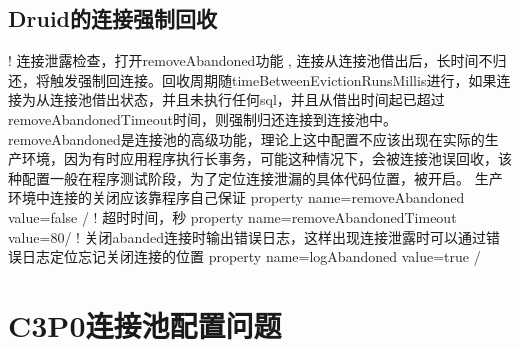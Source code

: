 \documentclass[a4,10pt,oneside,english]{sphinxmanual}
\begin{document}
\subsection{Druid的连接强制回收}
\label{\detokenize{interface/druid:id3}}
\begin{sphinxVerbatim}[commandchars=\\\{\}]
\PYGZlt{}!\PYGZhy{}\PYGZhy{} 连接泄露检查，打开removeAbandoned功能 , 连接从连接池借出后，长时间不归还，将触发强制回连接。回收周期随timeBetweenEvictionRunsMillis进行，如果连接为从连接池借出状态，并且未执行任何sql，并且从借出时间起已超过removeAbandonedTimeout时间，则强制归还连接到连接池中。
removeAbandoned是连接池的高级功能，理论上这中配置不应该出现在实际的生产环境，因为有时应用程序执行长事务，可能这种情况下，会被连接池误回收，该种配置一般在程序测试阶段，为了定位连接泄漏的具体代码位置，被开启。
生产环境中连接的关闭应该靠程序自己保证 \PYGZhy{}\PYGZhy{}\PYGZgt{}
\PYGZlt{}property name=\PYGZdq{}removeAbandoned\PYGZdq{} value=\PYGZdq{}false\PYGZdq{} /\PYGZgt{}
\PYGZlt{}!\PYGZhy{}\PYGZhy{} 超时时间，秒 \PYGZhy{}\PYGZhy{}\PYGZgt{}
\PYGZlt{}property name=\PYGZdq{}removeAbandonedTimeout\PYGZdq{} value=\PYGZdq{}80\PYGZdq{}/\PYGZgt{}
\PYGZlt{}!\PYGZhy{}\PYGZhy{} 关闭abanded连接时输出错误日志，这样出现连接泄露时可以通过错误日志定位忘记关闭连接的位置 \PYGZhy{}\PYGZhy{}\PYGZgt{}
\PYGZlt{}property name=\PYGZdq{}logAbandoned\PYGZdq{} value=\PYGZdq{}true\PYGZdq{} /\PYGZgt{}
\end{sphinxVerbatim}


\section{C3P0连接池配置问题}
\label{\detokenize{interface/c3p0:c3p0}}\label{\detokenize{interface/c3p0::doc}}
\end{document}
